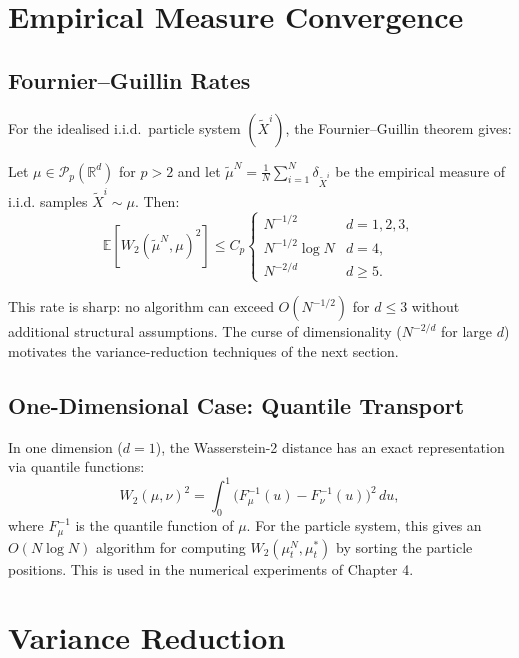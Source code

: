 \section{Empirical Measure Convergence}

\subsection{Fournier--Guillin Rates}

For the idealised i.i.d.\ particle system $(\tilde X^i)$, the Fournier--Guillin
theorem \citep{fournierguillin2015} gives:
\begin{theorem}
\label{thm:fournier-guillin-rates}
Let $\mu \in \mathcal{P}_p(\mathbb{R}^d)$ for $p > 2$ and let $\tilde\mu^N =
\frac{1}{N}\sum_{i=1}^N \delta_{\tilde X^i}$ be the empirical measure of i.i.d.
samples $\tilde X^i \sim \mu$. Then:
\[
    \mathbb{E}[W_2(\tilde\mu^N, \mu)^2] \le C_p \begin{cases}
        N^{-1/2} & d = 1, 2, 3, \\
        N^{-1/2}\log N & d = 4, \\
        N^{-2/d} & d \ge 5.
    \end{cases}
\]
\end{theorem}

This rate is sharp: no algorithm can exceed $O(N^{-1/2})$ for $d \le 3$ without
additional structural assumptions. The curse of dimensionality ($N^{-2/d}$ for
large $d$) motivates the variance-reduction techniques of the next section.

\subsection{One-Dimensional Case: Quantile Transport}

In one dimension ($d = 1$), the Wasserstein-2 distance has an exact representation
via quantile functions:
\begin{equation}
    W_2(\mu, \nu)^2 = \int_0^1 \big(F_\mu^{-1}(u) - F_\nu^{-1}(u)\big)^2\, du,
    \label{eq:1d-wasserstein-particle}
\end{equation}
where $F_\mu^{-1}$ is the quantile function of $\mu$. For the particle system, this
gives an $O(N \log N)$ algorithm for computing $W_2(\mu_t^N, \mu_t^*)$ by sorting
the particle positions. This is used in the numerical experiments of Chapter 4.

\section{Variance Reduction}

